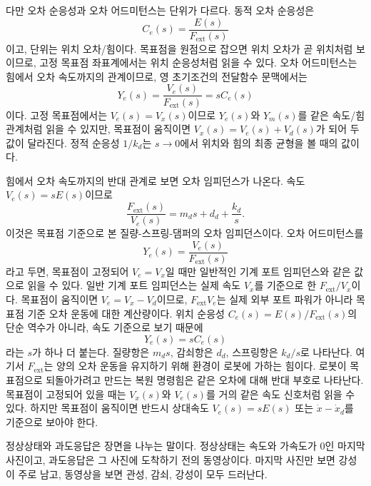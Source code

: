 다만 오차 순응성과 오차 어드미턴스는 단위가 다르다.
동적 오차 순응성은
\begin{equation}
  C_e(s)=\frac{E(s)}{F_{\mathrm{ext}}(s)}
\end{equation}
이고, 단위는 위치 오차/힘이다.
목표점을 원점으로 잡으면 위치 오차가 곧 위치처럼 보이므로, 고정 목표점 좌표계에서는 위치 순응성처럼 읽을 수 있다.
오차 어드미턴스는 힘에서 오차 속도까지의 관계이므로, 영 초기조건의 전달함수 문맥에서는
\begin{equation}
  Y_e(s)=\frac{V_e(s)}{F_{\mathrm{ext}}(s)}=sC_e(s)
\end{equation}
이다.
고정 목표점에서는 $V_e(s)=V_x(s)$이므로 $Y_e(s)$와 $Y_m(s)$를 같은 속도/힘 관계처럼 읽을 수 있지만, 목표점이 움직이면 $V_x(s)=V_e(s)+V_d(s)$가 되어 두 값이 달라진다.
정적 순응성 $1/k_d$는 $s\to 0$에서 위치와 힘의 최종 균형을 볼 때의 값이다.

힘에서 오차 속도까지의 반대 관계로 보면 오차 임피던스가 나온다.
속도 $V_e(s)=sE(s)$이므로
\begin{equation}
  \frac{F_{\mathrm{ext}}(s)}{V_e(s)}
  =
  m_d s+d_d+\frac{k_d}{s}.
  \label{eq:control_impedance_transfer}
\end{equation}
이것은 목표점 기준으로 본 질량-스프링-댐퍼의 오차 임피던스이다.
오차 어드미턴스를
\begin{equation}
  Y_e(s)=\frac{V_e(s)}{F_{\mathrm{ext}}(s)}
\end{equation}
라고 두면, 목표점이 고정되어 $V_e=V_x$일 때만 일반적인 기계 포트 임피던스와 같은 값으로 읽을 수 있다.
일반 기계 포트 임피던스는 실제 속도 $V_x$를 기준으로 한 $F_{\mathrm{ext}}/V_x$이다.
목표점이 움직이면 $V_e=V_x-V_d$이므로, $F_{\mathrm{ext}}V_e$는 실제 외부 포트 파워가 아니라 목표점 기준 오차 운동에 대한 계산량이다.
위치 순응성 $C_e(s)=E(s)/F_{\mathrm{ext}}(s)$의 단순 역수가 아니라, 속도 기준으로 보기 때문에
\begin{equation}
  Y_e(s)=sC_e(s)
\end{equation}
라는 $s$가 하나 더 붙는다.
질량항은 $m_d s$, 감쇠항은 $d_d$, 스프링항은 $k_d/s$로 나타난다.
여기서 $F_{\mathrm{ext}}$는 양의 오차 운동을 유지하기 위해 환경이 로봇에 가하는 힘이다.
로봇이 목표점으로 되돌아가려고 만드는 복원 명령힘은 같은 오차에 대해 반대 부호로 나타난다.
목표점이 고정되어 있을 때는 $V_x(s)$와 $V_e(s)$를 거의 같은 속도 신호처럼 읽을 수 있다.
하지만 목표점이 움직이면 반드시 상대속도 $V_e(s)=sE(s)$ 또는 $\dot{x}-\dot{x}_d$를 기준으로 보아야 한다.

정상상태와 과도응답은 장면을 나누는 말이다.
정상상태는 속도와 가속도가 0인 마지막 사진이고, 과도응답은 그 사진에 도착하기 전의 동영상이다.
마지막 사진만 보면 강성이 주로 남고, 동영상을 보면 관성, 감쇠, 강성이 모두 드러난다.

